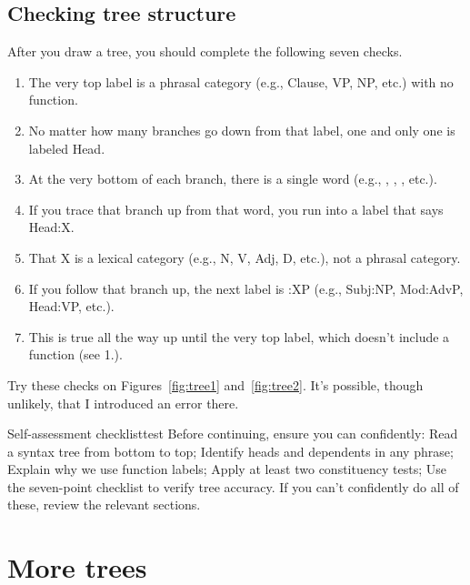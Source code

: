 \subsection{Checking tree structure}
\label{sec:checkTrees}

After you draw a tree, you should complete the following seven checks.

\begin{enumerate}[noitemsep]
    \item The very top label is a phrasal category (e.g., Clause, VP, NP, etc.) with no function.
    \item No matter how many branches go down from that label, one and only one is labeled Head.
    \item At the very bottom of each branch, there is a single word (e.g., , , , etc.).
    \item If you trace that branch up from that word, you run into a label that says Head:X.
    \item That X is a lexical category (e.g., N, V, Adj, D, etc.), not a phrasal category.
    \item If you follow that branch up, the next label is :XP (e.g., Subj:NP, Mod:AdvP, Head:VP, etc.).
    \item This is true all the way up until the very top label, which doesn't include a function (see 1.).
\end{enumerate}

Try these checks on Figures~\ref{fig:tree1} and~\ref{fig:tree2}. It's possible, though unlikely, that I introduced an error there.

\begin{tblsframedsymbol}{Self-assessment checklist}{test}
Before continuing, ensure you can confidently: Read a syntax tree from bottom to top; Identify heads and dependents in any phrase; Explain why we use function labels; Apply at least two constituency tests; Use the seven-point checklist to verify tree accuracy. If you can't confidently do all of these, review the relevant sections.
\end{tblsframedsymbol}

\section{More trees}\label{sec:more trees}

